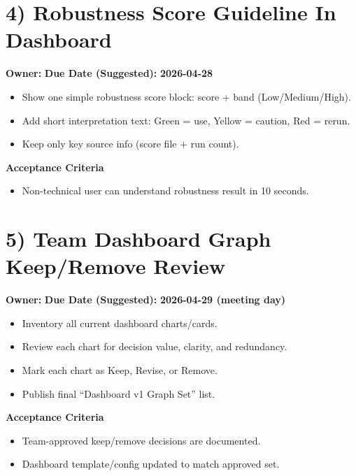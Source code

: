 \documentclass[11pt]{article}
\begin{document}
\section*{4) Robustness Score Guideline In Dashboard}
\textbf{Owner:} \underline{\hspace{2.0in}} \textbf{Due Date (Suggested):} \textbf{2026-04-28}
\vspace{0.15in}
\begin{itemize}
  \item[$\square$] Show one simple robustness score block: score + band (Low/Medium/High).
  \item[$\square$] Add short interpretation text: Green = use, Yellow = caution, Red = rerun.
  \item[$\square$] Keep only key source info (score file + run count).
\end{itemize}
\textbf{Acceptance Criteria}
\begin{itemize}
  \item[$\square$] Non-technical user can understand robustness result in 10 seconds.
\end{itemize}

\section*{5) Team Dashboard Graph Keep/Remove Review}
\textbf{Owner:} \underline{\hspace{2.0in}} \textbf{Due Date (Suggested):} \textbf{2026-04-29 (meeting day)}
\vspace{0.15in}
\begin{itemize}
  \item[$\square$] Inventory all current dashboard charts/cards.
  \item[$\square$] Review each chart for decision value, clarity, and redundancy.
  \item[$\square$] Mark each chart as Keep, Revise, or Remove.
  \item[$\square$] Publish final ``Dashboard v1 Graph Set'' list.
\end{itemize}
\textbf{Acceptance Criteria}
\begin{itemize}
  \item[$\square$] Team-approved keep/remove decisions are documented.
  \item[$\square$] Dashboard template/config updated to match approved set.
\end{itemize}
\end{document}
